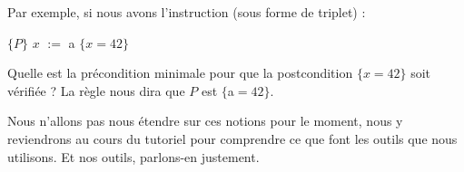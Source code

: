 Par exemple, si nous avons l'instruction (sous forme de triplet) :



$\{P\}$ $x$ $:=$ a $\{x = 42\}$



Quelle est la précondition minimale pour que la postcondition $\{x = 42\}$
soit vérifiée ? La règle nous dira que $P$ est $\{$a$=42\}$.



Nous n'allons pas nous étendre sur ces notions pour le moment, nous y
reviendrons au cours du tutoriel pour comprendre ce que font les outils que
nous utilisons. Et nos outils, parlons-en justement.
